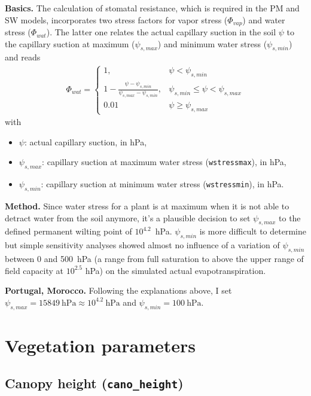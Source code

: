 \documentclass{scrreprt}
\newenvironment{denseitem}{
  \begin{itemize}
    \setlength{\itemsep}{0pt}
    \setlength{\parskip}{0pt}
    \setlength{\parsep}{0pt}
}{
  \end{itemize}
}
\begin{document}
\textbf{Basics.}
The calculation of stomatal resistance, which is required in the PM and SW models, incorporates two stress factors for vapor stress ($\Phi_{vap}$) and water stress ($\Phi_{wat}$).
The latter one relates the actual capillary suction in the soil $\psi$ to the capillary suction at maximum ($\psi_{s,max}$) and minimum water stress ($\psi_{s,min}$) and reads
%
\begin{align*}
  \Phi_{wat} = \begin{cases}
                1, & \psi < \psi_{s,min} \\
                1 - \frac{\psi - \psi_{s,min}}{\psi_{s,max} - \psi_{s,min}}, & \psi_{s,min} \leq \psi < \psi_{s,max} \\
                0.01 & \psi \geq \psi_{s,max}
              \end{cases}
\end{align*}
%
with
\begin{denseitem}
  \item[] $\psi$: actual capillary suction, in hPa,
  \item[] $\psi_{s,max}$: capillary suction at maximum water stress (\verb!wstressmax!), in hPa,
  \item[] $\psi_{s,min}$: capillary suction at minimum water stress (\verb!wstressmin!), in hPa.
\end{denseitem}

\textbf{Method.}
Since water stress for a plant is at maximum when it is not able to detract water from the soil anymore, it's a plausible decision to set $\psi_{s,max}$ to the defined \citep{scheffer10} permanent wilting point of $10^{4.2}$~hPa.
$\psi_{s,min}$ is more difficult to determine but simple sensitivity analyses showed almost no influence of a variation of $\psi_{s,min}$ between 0 and 500~hPa (a range from full saturation to above the upper range of field capacity at $10^{2.5}$ hPa) on the simulated actual evapotranspiration.

\textbf{Portugal, Morocco.}
Following the explanations above, I set $\psi_{s,max} = 15849~\text{hPa} \approx 10^{4.2}~\text{hPa}$ and $\psi_{s,min} = 100~\text{hPa}$.

\section{Vegetation parameters} \label{sec:parest_veg}

\subsection{Canopy height (\texttt{cano\_height})} \label{ssec:parest_veg_canoheight}
\end{document}

